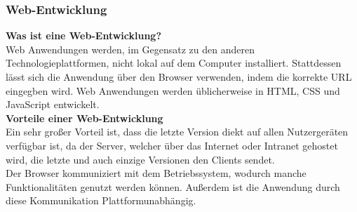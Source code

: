 \documentclass[ngerman]{article}
\begin{document}
    \subsubsection{Web-Entwicklung}
    \textbf{Was ist eine Web-Entwicklung?}\\
    Web Anwendungen werden, im Gegensatz zu den anderen Technologieplattformen, nicht lokal auf dem Computer installiert. Stattdessen lässt sich die Anwendung über den Browser verwenden, indem die korrekte URL eingegben wird. Web Anwendungen werden üblicherweise in HTML, CSS und JavaScript entwickelt. \cite{Native app vs Web app: Multi-criteria decision-making for optimised mobile solution}\\
    \textbf{Vorteile einer Web-Entwicklung}\\
    Ein sehr großer Vorteil ist, dass die letzte Version diekt auf allen Nutzergeräten verfügbar ist, da der Server, welcher über das Internet oder Intranet gehostet wird, die letzte und auch einzige Versionen den Clients sendet.\\
    Der Browser kommuniziert mit dem Betriebssystem, wodurch manche Funktionalitäten genutzt werden können. Außerdem ist die Anwendung durch diese Kommunikation Plattformunabhängig. \cite{Native app vs Web app: Multi-criteria decision-making for optimised mobile solution}\\
\end{document}
